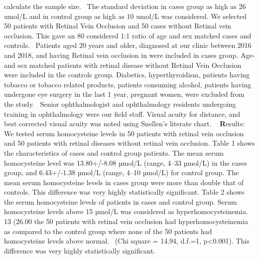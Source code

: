\documentclass{article}
\begin{document}
\begin{multicols*}{2}
calculate the sample size. ~\cite{d}The standard deviation in cases
group as high as 26 umol/L and in control group as high as
10 umol/L was considered. We selected 50 patients with
Retinal Vein Occlusion and 50 cases without Retinal vein
occlusion. This gave an 80%
considered 1:1 ratio of age and sex matched cases and
controls.~\cite{c} Patients aged 20 years and older, diagnosed at our
clinic between 2016 and 2018, and having Retinal vein
occlusion in were included in cases group. Age- and sex
matched patients with retinal disease without Retinal Vein
Occlusion were included in the controls group. Diabetics,
hyperthyroidism, patients having tobacco or tobacco related
products, patients consuming alcohol, patients having
undergone eye surgery in the last 1 year, pregnant women,
were excluded from the study.~\cite{c} Senior ophthalmologist and
ophthalmology residents undergoing training in
ophthalmology were our field staff. Visual acuity for
distance, and best corrected visual acuity was noted using
Snellen’s literate chart. ~\cite{d}
\newline
\newline
\textbf Results:
We tested serum homocysteine levels in 50 patients
with retinal vein occlusion and 50 patients with retinal
diseases without retinal vein occlusion. Table 1 shows the
characteristics of cases and control group patients. The
mean serum homocysteine level was 13.80+/-8.08 µmol/L
(range, 4–33 µmol/L) in the cases group, and 6.43+/-1.38
µmol/L (range, 4–10 µmol/L) for control group. The mean
serum homocysteine levels in cases group were more than
double that of controls. This difference was very highly
statistically significant. Table 2 shows the serum
homocysteine levels of patients in cases and control group.
Serum homocysteine levels above 15 µmol/L was
considered as hyperhomocysteinemia. 13 (26.00%
the 50 patients with retinal vein occlusion had
hyperhomocysteinemia as compared to the control group
where none of the 50 patients had homocysteine levels
above normal. ~\cite{d}(Chi square = 14.94, d.f.=1, p<0.001). This
difference was very highly statistically significant.
\end{multicols*}


\newpage
\end{document}
